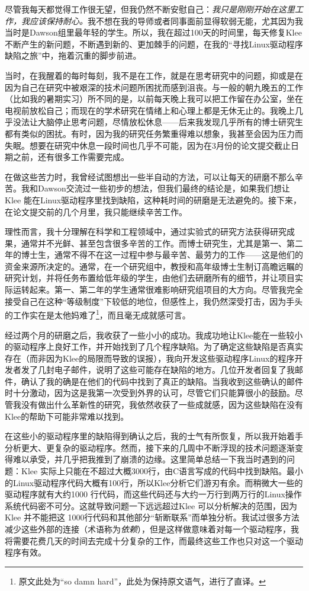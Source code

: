 \documentclass[12pt,UTF8,nofonts]{book}
\begin{document}
尽管我每天都觉得工作很无望，但我仍然不断安慰自己：\emph{我只是刚刚开始在这里工作，我应该保持耐心。}我不想在我的导师或者同事面前显得软弱无能，尤其因为我当时是Dawson组里最年轻的学生。所以，我在超过100天的时间里，每天修复Klee不断产生的新问题，不断遇到新的、更加棘手的问题，在我的“寻找Linux驱动程序缺陷之旅”中，拖着沉重的脚步前进。

当时，在我醒着的每时每刻，我不是在工作，就是在思考研究中的问题，抑或是在因为自己在研究中被艰深的技术问题所困扰而感到沮丧。与一般的朝九晚五的工作（比如我的暑期实习）所不同的是，以前每天晚上我可以把工作留在办公室，坐在电视前放松自己；而现在的学术研究在情绪上和心理上都是无休无止的。我晚上几乎没法让大脑停止思考问题，尽情放松休息——后来我发现几乎所有的博士研究生都有类似的困扰。有时，因为我的研究任务繁重得难以想象，我甚至会因为压力而失眠。想要在研究中休息一段时间也几乎不可能，因为在3月份的论文提交截止日期之前，还有很多工作需要完成。

在做这些苦力时，我曾经试图想出一些半自动的方法，可以让每天的研磨不那么辛苦。我和Dawson交流过一些初步的想法，但我们最终的结论是，如果我们想让Klee 能在Linux驱动程序里找到缺陷，这种耗时间的研磨是无法避免的。接下来，在论文提交前的几个月里，我只能继续辛苦工作。

理性而言，我十分理解在科学和工程领域中，通过实验式的研究方法获得研究成果，通常并不光鲜、甚至包含很多辛苦的工作。而博士研究生，尤其是第一、第二年的博士生，通常不得不在这一过程中参与最辛苦、最劳力的工作——这是他们的资金来源所决定的。通常，在一个研究组中，教授和高年级博士生制订高瞻远瞩的研究计划，并将任务布置给低年级的学生，由他们去研磨所有的细节，并让项目实际运转起来。第一、第二年的学生通常很难影响研究组项目的大方向。尽管我完全接受自己在这种“等级制度”下较低的地位，但感性上，我仍然深受打击，因为手头的工作实在是太他妈难了\footnote{原文此处为“so damn hard”，此处为保持原文语气，进行了直译。}，而且毫无成就感可言。

\breakline

经过两个月的研磨之后，我收获了一些小小的成功。我成功地让Klee能在一些较小的驱动程序上良好工作，并开始找到了几个程序缺陷。为了确定这些缺陷是否真实存在（而非因为Klee的局限而导致的误报），我向开发这些驱动程序Linux的程序开发者发了几封电子邮件，说明了这些可能存在缺陷的地方。几位开发者回复了我邮件，确认了我的确是在他们的代码中找到了真正的缺陷。当我收到这些确认的邮件时十分激动，因为这是我第一次受到外界的认可，尽管它们只能算很小的鼓励。尽管我没有做出什么革新性的研究，我依然收获了一些成就感，因为这些缺陷在没有Klee的帮助下可能非常难以找到。

在这些小的驱动程序里的缺陷得到确认之后，我的士气有所恢复，所以我开始着手分析更大、更复杂的驱动程序。然而，接下来的几周中不断浮现的技术问题逐渐变得难以承受，并几乎把我推到了崩溃的边缘。这里简单总结一下我当时遇到的问题：Klee 实际上只能在不超过大概3000行，由C语言写成的代码中找到缺陷。最小的Linux驱动程序代码大概有100行，所以Klee分析它们游刃有余。而稍微大一些的驱动程序就有大约1000 行代码，而这些代码还与大约一万行到两万行的Linux操作系统代码密不可分。这就导致问题一下远远超过Klee 可以分析解决的范围，因为Klee 并不能把这
1000行代码和其他部分“斩断联系”而单独分析。我试过很多方法减少这些外部的连接（术语称为\emph{依赖}），但是这样做意味着对每一个驱动程序，我将需要花费几天的时间去完成十分复杂的工作，而最终这些工作也只对这一个驱动程序有效。
\end{document}
